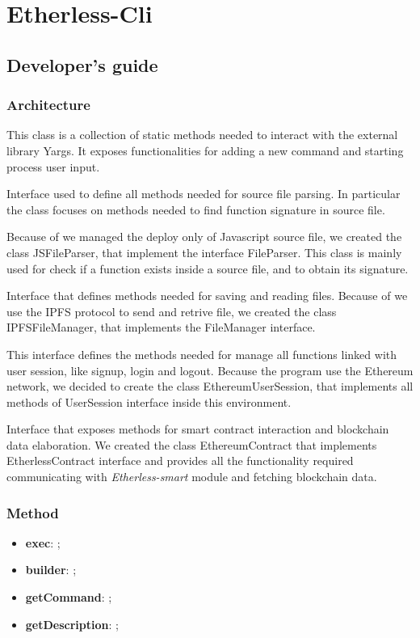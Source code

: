 \section{Etherless-Cli}	
	\subsection{Developer's guide}
	
		\subsubsection{Architecture}
			
			This class is a collection of static methods needed to interact with the external library Yargs. It exposes functionalities for adding a new command and starting process user input. 
						
			Interface used to define all methods needed for source file parsing. In particular the class focuses on methods needed to find function signature in source file. 
			
			Because of we managed the deploy only of Javascript source file, we created the class JSFileParser, that implement the interface FileParser. This class is mainly used for check if a function exists inside a source file, and to obtain its signature. 
			
			Interface that defines methods needed for saving and reading files. Because of we use the IPFS protocol to send and retrive file, we created the class IPFSFileManager, that implements the FileManager interface. 
			
			This interface defines the methods needed for manage all functions linked with user session, like signup, login and logout. Because the program use the Ethereum network, we decided to create the class EthereumUserSession, that implements all methods of UserSession interface inside this environment.  
			
			Interface that exposes methods for smart contract interaction and blockchain data elaboration. We created the class EthereumContract that implements EtherlessContract interface and provides all the functionality required communicating with \textit{Etherless-smart} module and fetching blockchain data.
			
		\subsubsection{Method} %
				\begin{itemize}
					\item \textbf{exec}: ;
					\item \textbf{builder}: ;
					\item \textbf{getCommand}: ;
					\item \textbf{getDescription}: ;
				\end{itemize}
			
